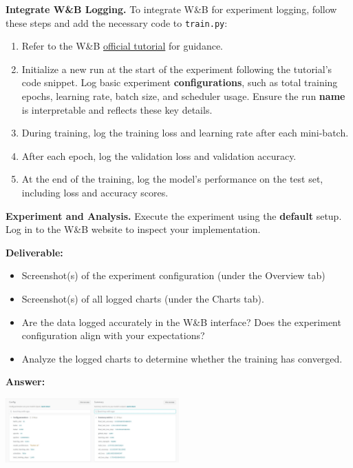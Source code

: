 \documentclass[11pt, oneside]{article}   	%
\begin{document}
\noindent \textbf{Integrate W\&B Logging.}
To integrate W\&B for experiment logging, follow these steps and add the necessary code to \texttt{train.py}:
\begin{enumerate}
    \item Refer to the W\&B \href{https://docs.wandb.ai/tutorials/experiments}{official tutorial} for guidance.
    \item Initialize a new run at the start of the experiment following the tutorial's code snippet. Log basic experiment \textbf{configurations}, such as total training epochs, learning rate, batch size, and scheduler usage. Ensure the run \textbf{name} is interpretable and reflects these key details.
    \item During training, log the training loss and learning rate after each mini-batch.
    \item After each epoch, log the validation loss and validation accuracy.
    \item At the end of the training, log the model's performance on the test set, including loss and accuracy scores.
\end{enumerate}

\noindent \textbf{Experiment and Analysis. }
Execute the experiment using the \textbf{default} setup. Log in to the W\&B website to inspect your implementation. 

\noindent\textbf{Deliverable:}
\begin{itemize}
    \item Screenshot(s) of the experiment configuration (under the Overview tab)
    \item Screenshot(s) of all logged charts (under the Charts tab).
    \item Are the data logged accurately in the W\&B interface? Does the experiment configuration align with your expectations?
    \item Analyze the logged charts to determine whether the training has converged.
\end{itemize}


\textbf{Answer:} \\
\begin{center}
    \includegraphics[width=0.5\textwidth]{p1p1_pic/Experiment_Config.png}
\end{center}
\end{document}
